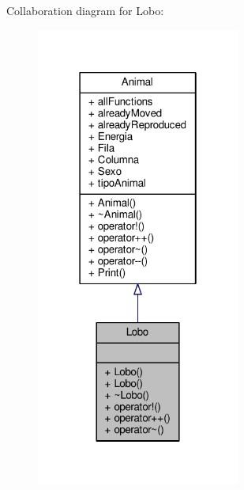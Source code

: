 Collaboration diagram for Lobo\+:\nopagebreak
\begin{figure}[H]
\begin{center}
\leavevmode
\includegraphics[width=190pt]{classLobo__coll__graph}
\end{center}
\end{figure}
